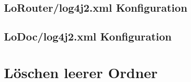 \subsection{LoRouter/log4j2.xml Konfiguration} 
\label{subsec:loRouter_log4j2_config}


\subsection{LoDoc/log4j2.xml Konfiguration} 
\label{subsec:loDoc_log4j2_config}


\section{Löschen leerer Ordner}
\label{subsec:deleteEmptyFolders.sh}

